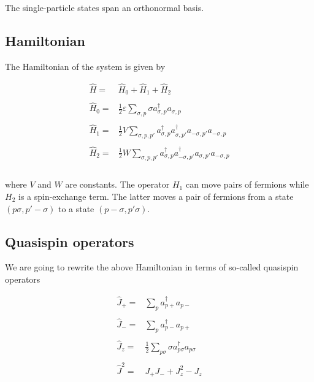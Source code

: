 \documentclass[11pt]{article}
\begin{document}
    The single-particle states span an orthonormal basis.

    \hypertarget{hamiltonian}{%
\subsection{Hamiltonian}\label{hamiltonian}}

The Hamiltonian of the system is given by

    \[
\begin{array}{ll}
\hat{H}=&\hat{H}_{0}+\hat{H}_{1}+\hat{H}_{2}\\
&\\
\hat{H}_{0}=&\frac{1}{2}\varepsilon\sum_{\sigma ,p}\sigma
a_{\sigma,p}^{\dagger}a_{\sigma ,p}\\
&\\
\hat{H}_{1}=&\frac{1}{2}V\sum_{\sigma ,p,p'}
a_{\sigma,p}^{\dagger}a_{\sigma ,p'}^{\dagger}
a_{-\sigma ,p'}a_{-\sigma ,p}\\
&\\
\hat{H}_{2}=&\frac{1}{2}W\sum_{\sigma ,p,p'}
a_{\sigma,p}^{\dagger}a_{-\sigma ,p'}^{\dagger}
a_{\sigma ,p'}a_{-\sigma ,p}\\
&\\
\end{array}
\]

    where \(V\) and \(W\) are constants. The operator \(H_{1}\) can move
pairs of fermions while \(H_{2}\) is a spin-exchange term. The latter
moves a pair of fermions from a state \((p\sigma ,p' -\sigma)\) to a
state \((p-\sigma ,p'\sigma)\).

    \hypertarget{quasispin-operators}{%
\subsection{Quasispin operators}\label{quasispin-operators}}

We are going to rewrite the above Hamiltonian in terms of so-called
quasispin operators

    \[
\begin{array}{ll}
\hat{J}_{+}=&\sum_{p}
a_{p+}^{\dagger}a_{p-}\\
&\\
\hat{J}_{-}=&\sum_{p}
a_{p-}^{\dagger}a_{p+}\\
&\\
\hat{J}_{z}=&\frac{1}{2}\sum_{p\sigma}\sigma
a_{p\sigma}^{\dagger}a_{p\sigma}\\
&\\
\hat{J}^{2}=&J_{+}J_{-}+J_{z}^{2}-J_{z}\\
&\\
\end{array}
\]
\end{document}
